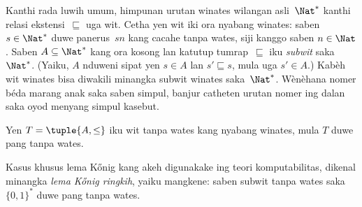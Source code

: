 \documentclass[../../../include/open-logic-section]{subfiles}
\begin{document}
\begin{ex}
Kanthi rada luwih umum, himpunan urutan winates
wilangan asli~$\Nat^*$ kanthi relasi
ekstensi~$\sqsubseteq$ uga wit.
Cetha yen wit iki ora nyabang winates:
saben $s \in \Nat^*$ duwe panerus~$sn$
kang cacahe tanpa wates, siji kanggo saben
$n \in \Nat$.
Saben $A\subseteq \Nat^*$ kang ora kosong lan katutup
tumrap~$\sqsubseteq$ iku \emph{subwit}
saka~$\Nat^*$.
(Yaiku, $A$ nduweni sipat yen $s \in A$
lan $s' \sqsubseteq s$, mula uga $s' \in A$.)
Kabèh wit winates bisa diwakili minangka subwit winates saka~$\Nat^*$.
Wènèhana nomer béda marang anak saka saben simpul, banjur catheten
urutan nomer ing dalan saka oyod menyang simpul kasebut.
\end{ex}

\begin{prop}
Yen $T = \tuple{A,\le}$ iku wit tanpa wates
kang nyabang winates, mula $T$
duwe pang tanpa wates.
\end{prop}

Kasus khusus lema K\H{o}nig kang akeh digunakake
ing teori komputabilitas, dikenal minangka
\emph{lema K\H{o}nig ringkih}, yaiku mangkene:
saben subwit tanpa wates saka $\{0,1\}^*$
duwe pang tanpa wates.
\end{document}
